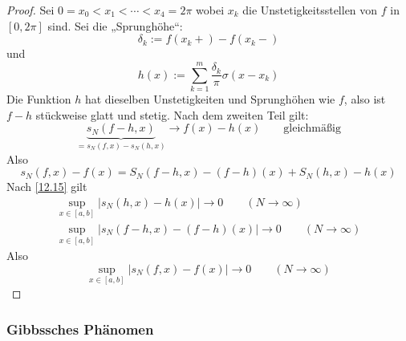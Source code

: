 \documentclass[a4paper,10pt]{scrartcl}
\begin{document}
\begin{thm}
\begin{proof}
Sei $ 0=x_0<x_1<\dotsb < x_4=2\pi$ wobei $x_k$ die Unstetigkeitsstellen von $f$ in $[0,2\pi]$ sind.
Sei die „Sprunghöhe“:
\[
\delta_k:=f(x_k+)-f(x_k-)
\]
und
\[
h(x):=\sum_{k=1}^m\frac {\delta_k}\pi \sigma(x-x_k)
\]
Die Funktion $h$ hat dieselben Unstetigkeiten und Sprunghöhen wie $f$, also ist $f-h$ stückweise glatt und stetig.
Nach dem zweiten Teil gilt:
\[
\underbrace{s_N(f-h,x)}_{=s_N(f,x)-s_N(h,x)}\to f(x)-h(x) \qquad \text{gleichmäßig}
\]
Also
\[
s_N(f,x)-f(x) = S_N(f-h,x)-(f-h)(x) + S_N(h,x)-h(x)
\]
Nach \ref{12.15} gilt
\begin{align*}
\sup_{x\in[a,b]}|s_N(h,x)-h(x)|\to 0 \qquad (N\to \infty)\\
\sup_{x\in[a,b]}|s_N(f-h,x)-(f-h)(x)| \to 0 \qquad (N\to \infty)
\end{align*}
Also
\[
\sup_{x\in[a,b]}|s_N(f,x)-f(x)|\to 0\qquad (N\to \infty)
\]
\end{proof}
\end{thm}

\subsubsection{Gibbssches Phänomen}
\end{document}
